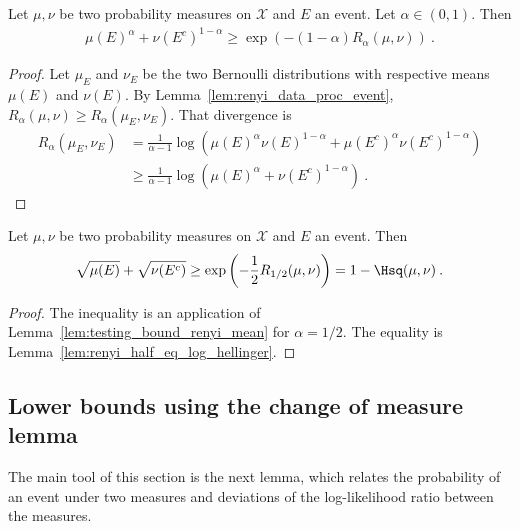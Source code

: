 \begin{lemma}
  \label{lem:testing_bound_renyi_mean}
  Let $\mu, \nu$ be two probability measures on $\mathcal X$ and $E$ an event. Let $\alpha \in (0,1)$. Then
  \begin{align*}
  \mu(E)^\alpha + \nu(E^c)^{1 - \alpha}
  \ge \exp\left(-(1 - \alpha) R_{\alpha}(\mu, \nu)\right)
  \: .
  \end{align*}
\end{lemma}

\begin{proof}
Let $\mu_E$ and $\nu_E$ be the two Bernoulli distributions with respective means $\mu(E)$ and $\nu(E)$.
By Lemma~\ref{lem:renyi_data_proc_event}, $R_\alpha(\mu, \nu) \ge R_\alpha(\mu_E, \nu_E)$. That divergence is
\begin{align*}
R_\alpha(\mu_E, \nu_E)
&= \frac{1}{\alpha - 1}\log \left(\mu(E)^\alpha \nu(E)^{1 - \alpha}
  + \mu(E^c)^\alpha \nu(E^c)^{1 - \alpha}\right)
\\
&\ge \frac{1}{\alpha - 1}\log \left(\mu(E)^\alpha + \nu(E^c)^{1 - \alpha}\right)
\: .
\end{align*}
\end{proof}

\begin{corollary}
  \label{cor:testing_bound_hellinger}
  Let $\mu, \nu$ be two probability measures on $\mathcal X$ and $E$ an event. Then
  \begin{align*}
  \sqrt{\mu(E)} + \sqrt{\nu(E^c)}
  \ge \exp\left(-\frac{1}{2} R_{1/2}(\mu, \nu)\right)
  = 1 - \Hsq(\mu, \nu)
  \: .
  \end{align*}
\end{corollary}

\begin{proof}
The inequality is an application of Lemma~\ref{lem:testing_bound_renyi_mean} for $\alpha = 1/2$. The equality is Lemma~\ref{lem:renyi_half_eq_log_hellinger}.
\end{proof}



\subsection{Lower bounds using the change of measure lemma}

The main tool of this section is the next lemma, which relates the probability of an event under two measures and deviations of the log-likelihood ratio between the measures.

